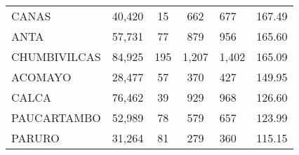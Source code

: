\begin{tabular}{lrcclr}
	\cellcolor[HTML]{FFFF99}CANAS                                  & 40,420                                                         & 15                                                         & 662                  & 677                                                                 & 167.49                                                                       \\
	\cellcolor[HTML]{FFFF99}ANTA                                   & 57,731                                                         & 77                                                         & 879                  & 956                                                                 & 165.60                                                                       \\
	\cellcolor[HTML]{C6E0B4}CHUMBIVILCAS                           & 84,925                                                         & 195                                                        & 1,207                & 1,402                                                               & 165.09                                                                       \\
	\cellcolor[HTML]{C6E0B4}ACOMAYO                                & 28,477                                                         & 57                                                         & 370                  & 427                                                                 & 149.95                                                                       \\
	\cellcolor[HTML]{C6E0B4}CALCA                                  & 76,462                                                         & 39                                                         & 929                  & 968                                                                 & 126.60                                                                       \\
	\cellcolor[HTML]{C6E0B4}PAUCARTAMBO                            & 52,989                                                         & 78                                                         & 579                  & 657                                                                 & 123.99                                                                       \\
	\cellcolor[HTML]{C6E0B4}PARURO                                 & 31,264                                                         & 81                                                         & 279                  & 360                                                                 & 115.15                                                                       \\

\end{tabular}
